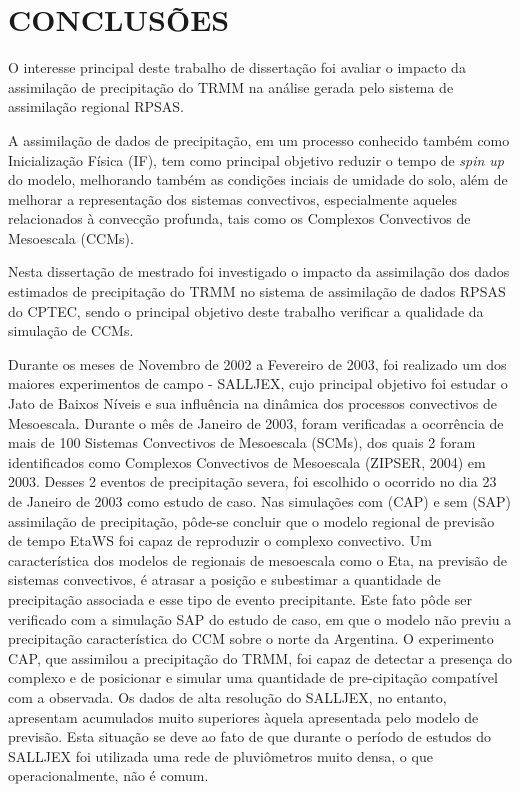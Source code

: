 \hypertarget{estilo:capitulo}{}
\chapter{CONCLUSÕES}

O interesse principal deste trabalho de dissertação foi avaliar o impacto da assimilação de precipitação do TRMM na análise gerada pelo sistema de assimilação regional RPSAS.

A assimilação de dados de precipitação, em um processo conhecido também como Inicialização Física (IF), tem como principal objetivo reduzir o tempo de \textit{spin up} do modelo, melhorando também as condições inciais de umidade do solo, além de melhorar a representação dos sistemas convectivos, especialmente aqueles relacionados à convecção profunda, tais como os Complexos Convectivos de Mesoescala (CCMs).

Nesta dissertação de mestrado foi investigado o impacto da assimilação dos dados estimados de precipitação do TRMM no sistema de assimilação de dados RPSAS do CPTEC, sendo o principal objetivo deste trabalho verificar a qualidade da simulação de CCMs.

Durante os meses de Novembro de 2002 a Fevereiro de 2003, foi realizado um dos maiores experimentos de campo - SALLJEX, cujo principal objetivo foi estudar o Jato de Baixos Níveis e sua influência na dinâmica dos processos convectivos de Mesoescala. Durante o mês de Janeiro de 2003, foram verificadas a ocorrência de mais de 100 Sistemas Convectivos de Mesoescala (SCMs), dos quais 2 foram identificados como Complexos Convectivos de Mesoescala (ZIPSER, 2004) em 2003.  Desses 2 eventos de precipitação severa, foi escolhido o ocorrido no dia 23 de Janeiro de 2003 como estudo de caso. Nas simulações com (CAP) e sem (SAP) assimilação de precipitação, pôde-se concluir que o modelo regional de previsão de tempo EtaWS foi capaz de reproduzir o complexo convectivo. Um característica dos modelos de regionais de mesoescala como o Eta, na previsão de sistemas convectivos, é atrasar a posição e subestimar a quantidade de precipitação associada e esse tipo de evento precipitante. Este fato pôde ser verificado com a simulação SAP do estudo de caso, em que o modelo não previu a precipitação característica do CCM sobre o norte da Argentina. O experimento CAP, que assimilou a precipitação do TRMM, foi capaz de detectar a presença do complexo e de posicionar e simular uma quantidade de pre-cipitação compatível com a observada. Os dados de alta resolução do SALLJEX, no entanto, apresentam acumulados muito superiores àquela apresentada pelo modelo de previsão. Esta situação se deve ao fato de que durante o período de estudos do SALLJEX foi utilizada uma rede de pluviômetros muito densa, o que operacionalmente, não é comum.

